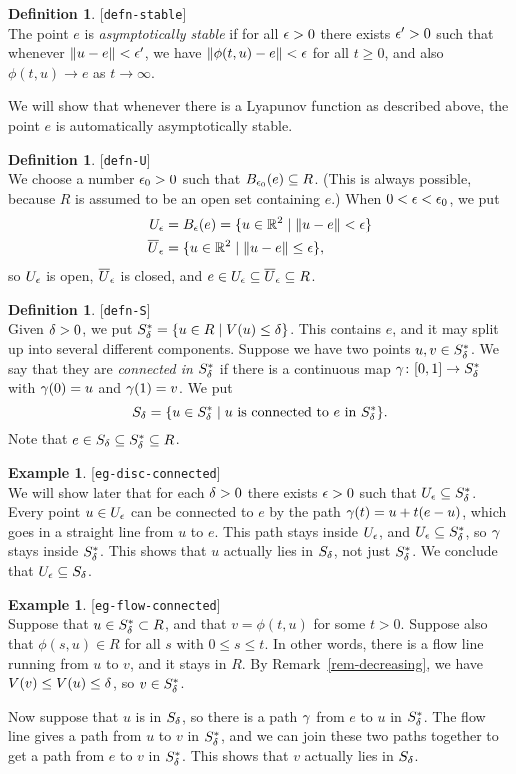 \documentclass[reqno]{amsart}
\newcommand{\lbl}[1]{\label{#1}\textup{[\texttt{#1}]}\ \\}
\newcommand{\lbl}{\label}
\theoremstyle{definition}
\newtheorem{definition}[theorem]{Definition}
\newtheorem{example}[theorem]{Example}
\begin{document}
\begin{definition}\lbl{defn-stable}
 The point $e$ is \emph{asymptotically stable} if for all $\epsilon>0$
 there exists $\epsilon'>0$ such that whenever $\|u-e\|<\epsilon'$, we have
 $\|\phi(t,u)-e\|<\epsilon$ for all $t\geq 0$, and also $\phi(t,u)\to e$ as
 $t\to\infty$. 
\end{definition}

We will show that whenever there is a Lyapunov function as described
above, the point $e$ is automatically asymptotically stable.

\begin{definition}\lbl{defn-U}
 We choose a number $\epsilon_0>0$ such that $B_{\epsilon_0}(e)\subseteq R$.  (This
 is always possible, because $R$ is assumed to be an open set
 containing $e$.)  When $0<\epsilon<\epsilon_0$, we put 
 \begin{align*}
  U_\epsilon &= B_\epsilon(e) = \{u\in{\mathbb{R}}^2\;|\; \|u-e\|<\epsilon\} \\
  \overline{U}_\epsilon &=  \{u\in{\mathbb{R}}^2\;|\; \|u-e\|\leq\epsilon\},
 \end{align*}
 so $U_\epsilon$ is open, $\overline{U}_\epsilon$ is closed, and
 $e\in U_\epsilon\subseteq\overline{U}_\epsilon\subseteq R$.
\end{definition}

\begin{definition}\lbl{defn-S}
 Given $\delta>0$, we put $S^*_{\delta}=\{u\in R\;|\; V(u)\leq\delta\}$.  This
 contains $e$, and it may split up into several different components.
 Suppose we have two points $u,v\in S^*_\delta$.  We say that they are
 \emph{connected in $S^*_\delta$} if there is a continuous map
 $\gamma\colon[0,1]\to S^*_\delta$ with $\gamma(0)=u$ and $\gamma(1)=v$.  We put 
 \[ S_\delta = \{u\in S_\delta^*\;|\; u \text{ is connected to } e
               \text{ in } S_\delta^* \}.
 \]
 Note that $e\in S_\delta\subseteq S^*_\delta\subseteq R$.
\end{definition}

\begin{example}\lbl{eg-disc-connected}
 We will show later that for each $\delta>0$ there exists $\epsilon>0$ such that
 $U_\epsilon\subseteq S_\delta^*$.  Every point $u\in U_\epsilon$ can be connected to
 $e$ by the path $\gamma(t)=u+t(e-u)$, which goes in a straight line from
 $u$ to $e$.  This path stays inside $U_\epsilon$, and $U_\epsilon\subseteq S_\delta^*$,
 so $\gamma$ stays inside $S_\delta^*$.  This shows that $u$ actually lies
 in $S_\delta$, not just $S_\delta^*$.  We conclude that $U_\epsilon\subseteq S_\delta$.
\end{example}

\begin{example}\lbl{eg-flow-connected}
 Suppose that $u\in S^*_\delta\subset R$, and that $v=\phi(t,u)$ for some
 $t>0$.  Suppose also that $\phi(s,u)\in R$ for all $s$ with
 $0\leq s\leq t$.  In other words, there is a flow line running from
 $u$ to $v$, and it stays in $R$.  By Remark~\ref{rem-decreasing}, we
 have $V(v)\leq V(u)\leq\delta$, so $v\in S_\delta^*$.

 Now suppose that $u$ is in $S_\delta$, so there is a path $\gamma$ from $e$
 to $u$ in $S_\delta^*$.  The flow line gives a path from $u$ to $v$ in
 $S_\delta^*$, and we can join these two paths together to get a path
 from $e$ to $v$ in $S_\delta^*$.  This shows that $v$ actually lies in
 $S_\delta$.
\end{example}
\end{document}
